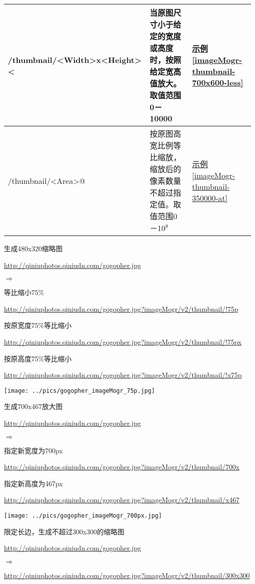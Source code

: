 \documentclass[11pt, oneside]{book}
\newcommand{\qpar}[1]{
\vspace{0.25em}
\noindent
#1\par
\vspace{0.25em}
}
\newcommand{\qurl}[1]{\url{#1}}
\begin{document}
\begin{CJK*}{UTF8}{song}
{\begin{tabular}[t]{|l|p{18em}|p{4em}|}
\hline
/thumbnail/\textless Width\textgreater x\textless Height\textgreater \textless & 当原图尺寸小于给定的宽度或高度时，按照给定宽高值放大。取值范围0－10000 &  \hyperref[imageMogr-thumbnail-700x600-less]{示例\ref*{imageMogr-thumbnail-700x600-less}} \\
\hline
/thumbnail/\textless Area\textgreater @ & 按原图高宽比例等比缩放，缩放后的像素数量不超过指定值。取值范围0－10$^8$ & \hyperref[imageMogr-thumbnail-350000-at]{示例\ref*{imageMogr-thumbnail-350000-at}} \\
\hline
\end{tabular}
}

\begin{sample}
  \caption{生成480x320缩略图}
    \qpar{\qurl{http://qiniuphotos.qiniudn.com/gogopher.jpg}}
    \qpar{$\Rightarrow$}
    \qpar{等比缩小75\%}
    \qpar{\qurl{http://qiniuphotos.qiniudn.com/gogopher.jpg?imageMogr/v2/thumbnail/!75p}}
    \qpar{按原宽度75\%等比缩小}
    \qpar{\qurl{http://qiniuphotos.qiniudn.com/gogopher.jpg?imageMogr/v2/thumbnail/!75px}}
    \qpar{按原高度75\%等比缩小}
    \qpar{\qurl{http://qiniuphotos.qiniudn.com/gogopher.jpg?imageMogr/v2/thumbnail/!x75p}}

    \begin{center}
      \texttt{[image: ../pics/gogopher\_imageMogr\_75p.jpg]}
    \end{center}
  \label{imageMogr-thumbnail-75p}
\end{sample}

\begin{sample}
  \caption{生成700x467放大图}
    \qpar{\qurl{http://qiniuphotos.qiniudn.com/gogopher.jpg}}
    \qpar{$\Rightarrow$}
    \qpar{指定新宽度为700px}
    \qpar{\qurl{http://qiniuphotos.qiniudn.com/gogopher.jpg?imageMogr/v2/thumbnail/700x}}
    \qpar{指定新高度为467px}
    \qpar{\qurl{http://qiniuphotos.qiniudn.com/gogopher.jpg?imageMogr/v2/thumbnail/x467}}

    \begin{center}
      \texttt{[image: ../pics/gogopher\_imageMogr\_700px.jpg]}
    \end{center}
  \label{imageMogr-thumbnail-700px}
\end{sample}

\begin{sample}
  \caption{限定长边，生成不超过300x300的缩略图}
    \qpar{\qurl{http://qiniuphotos.qiniudn.com/gogopher.jpg}}
    \qpar{$\Rightarrow$}
    \qpar{\qurl{http://qiniuphotos.qiniudn.com/gogopher.jpg?imageMogr/v2/thumbnail/300x300}}


\end{sample}
\end{CJK*}
\end{document}
